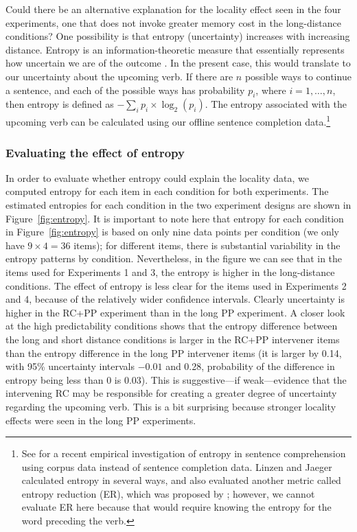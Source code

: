 \documentclass{frontiersSCNS}\usepackage{knitr} %
\begin{document}
Could there be an alternative explanation for the locality effect seen in the four experiments, one that does not invoke greater memory cost in the long-distance conditions?  One possibility is that entropy (uncertainty) increases with increasing distance. Entropy is an information-theoretic measure that essentially represents how uncertain we are of the outcome \citep{shannon2001mathematical}. In the present case, this would translate to our uncertainty about the upcoming verb.  If there are $n$ possible ways to continue a sentence,  and each of the possible ways has probability $p_i$, where $i=1,\dots, n$, then entropy is defined \citep{shannon2001mathematical} as $-\sum_{i} p_i \times \log_2 (p_i)$.
The entropy associated with the upcoming verb can be calculated using our offline sentence completion data.\footnote{See \citet{linzen2015uncertainty} for a recent empirical investigation of entropy in sentence comprehension using corpus data instead of sentence completion data.  Linzen and Jaeger calculated entropy in several ways, and also evaluated another metric called entropy reduction (ER), which was proposed by \citealp{hale06}; however, we cannot evaluate ER here because that would require knowing the entropy for the word preceding the verb.} 

\subsubsection{Evaluating the effect of entropy}
In order to evaluate whether entropy could explain the locality data, we computed entropy for each item in each condition for both experiments. The estimated entropies for each condition in the two experiment designs are shown in Figure~\ref{fig:entropy}. 
It is important to note here that entropy for each condition in Figure~\ref{fig:entropy} is based on only nine data points per condition (we only have $9\times 4=36$ items); for different items, there is substantial variability in the entropy patterns by condition.
Nevertheless, in the figure we can see that in the items used for Experiments 1 and 3, the entropy is higher in the long-distance conditions. The effect of entropy is less clear for the items used in Experiments 2 and 4, because of the relatively wider confidence intervals. 
Clearly uncertainty is higher in the RC+PP experiment than in the long PP experiment. A closer look at the high predictability conditions shows that the entropy difference between the long and short distance conditions is larger in the RC+PP intervener items than the entropy difference in the long PP intervener items 
(it is larger by 0.14, with 95\% uncertainty intervals \ensuremath{-0.01} and 0.28, probability of the difference in entropy being less than 0 is 0.03).  This is suggestive---if weak---evidence that the intervening RC may be responsible for creating a greater degree of uncertainty regarding the upcoming verb.   This is a bit surprising because stronger locality effects were seen in the long PP experiments. 
\end{document}
